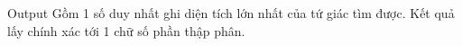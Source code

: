Output
Gồm 1 số duy nhất ghi diện tích lớn nhất của tứ giác tìm được. Kết quả lấy chính xác tới 1 chữ số phần thập phân.